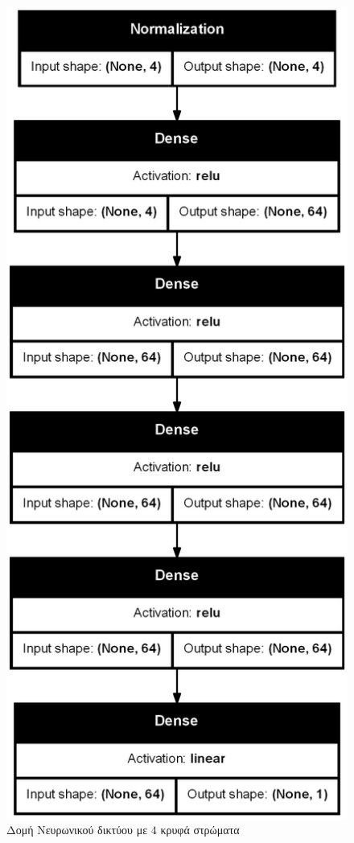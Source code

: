 \begin{figure}[H]
  \centering
  \begin{minipage}{0.4\textwidth}
      \centering
      \includegraphics[width=\linewidth]{images/Results/Neural Net/4HL/structure.png}
      \caption{Δομή Νευρωνικού δικτύου με $4$ κρυφά στρώματα}
      \label{fig:Neural Network Structure with 4 Hidden layer}
  

\end{minipage}
\end{figure}
